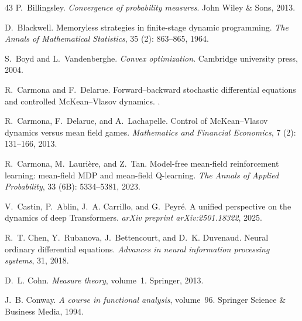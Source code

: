 \documentclass[11pt]{article}
\begin{document}
\begin{thebibliography}{43}
P.~Billingsley.
\newblock \emph{Convergence of probability measures}.
\newblock John Wiley \& Sons, 2013.

D.~Blackwell.
\newblock Memoryless strategies in finite-stage dynamic programming.
\newblock \emph{The Annals of Mathematical Statistics}, 35 (2): 863--865, 1964.

S.~Boyd and L.~Vandenberghe.
\newblock \emph{Convex optimization}.
\newblock Cambridge university press, 2004.

R.~Carmona and F.~Delarue.
\newblock Forward--backward stochastic differential equations and controlled {McKean--Vlasov} dynamics.
.

R.~Carmona, F.~Delarue, and A.~Lachapelle.
\newblock Control of {McKean--Vlasov} dynamics versus mean field games.
\newblock \emph{Mathematics and Financial Economics}, 7 (2): 131--166, 2013.

R.~Carmona, M.~Lauri{\`e}re, and Z.~Tan.
\newblock Model-free mean-field reinforcement learning: mean-field {MDP} and mean-field {Q}-learning.
\newblock \emph{The Annals of Applied Probability}, 33 (6B): 5334--5381, 2023.

V.~Castin, P.~Ablin, J.~A. Carrillo, and G.~Peyr{\'e}.
\newblock A unified perspective on the dynamics of deep {T}ransformers.
\newblock \emph{arXiv preprint arXiv:2501.18322}, 2025.

R.~T. Chen, Y.~Rubanova, J.~Bettencourt, and D.~K. Duvenaud.
\newblock Neural ordinary differential equations.
\newblock \emph{Advances in neural information processing systems}, 31, 2018.

D.~L. Cohn.
\newblock \emph{Measure theory}, volume~1.
\newblock Springer, 2013.

J.~B. Conway.
\newblock \emph{A course in functional analysis}, volume~96.
\newblock Springer Science \& Business Media, 1994.


\end{thebibliography}
\end{document}
